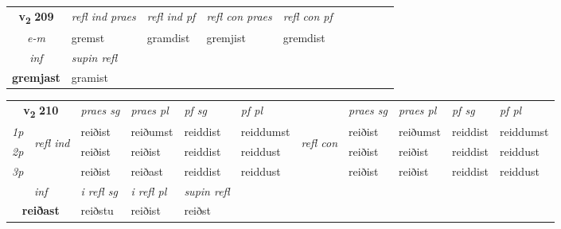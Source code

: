 \noindent
\begin{tabular}{lllllllllll} \toprule
\multicolumn{2}{c}{\textbf{v{\textsubscript{2}}} \Large{\textbf{209}}}  & \textit{refl ind praes} & \textit{refl ind pf} & \textit{refl con praes} & \textit{refl con pf} \\*
 \multicolumn{2}{c}{ \textit{e-m} }& gremst & gramdist & gremjist & gremdist \\*

\cmidrule{3-3}
   \multicolumn{2}{c}{\textit{inf}}       & \textit{supin refl}  \\*
  \multicolumn{2}{c}{\textbf{gremjast}}        & gramist  \\*
\end{tabular}

\noindent
\begin{tabular}{lllllllllll} \toprule
\multicolumn{2}{c}{\textbf{v{\textsubscript{2}}} \Large{\textbf{210}}}  &  \textit{praes sg}  & \textit{praes pl}  &\textit{ pf sg} & \textit{pf pl} &  &  \textit{praes sg}  & \textit{praes pl}  & \textit{pf sg} & \textit{pf pl } \\*
	\cmidrule{3-6} \cmidrule{8-11}
 {\textit{1p}} & \multirow{3}{*}{\begin{turn}{90}\textit{refl ind}\end{turn}}  & reiðist & reiðumst & reiddist & reiddumst & \multirow{3}{*}{\begin{turn}{90}\textit{refl con}\end{turn}}  &reiðist & reiðumst & reiddist & reiddumst \\*
 {\textit{2p}} &  & reiðist & reiðist & reiddist & reiddust & &reiðist & reiðist & reiddist & reiddust \\*
 {\textit{3p}}  & & reiðist & reiðast & reiddist & reiddust & & reiðist & reiðist& reiddist & reiddust \\*
\cmidrule{3-6} \cmidrule{8-11}

   \multicolumn{2}{c}{\textit{inf}}   & \textit{i refl sg} & \textit{i refl pl}   & \textit{supin refl}  \\*
  \multicolumn{2}{c}{\textbf{reiðast}}    & reiðstu & reiðist   & reiðst  \\*
\end{tabular}

